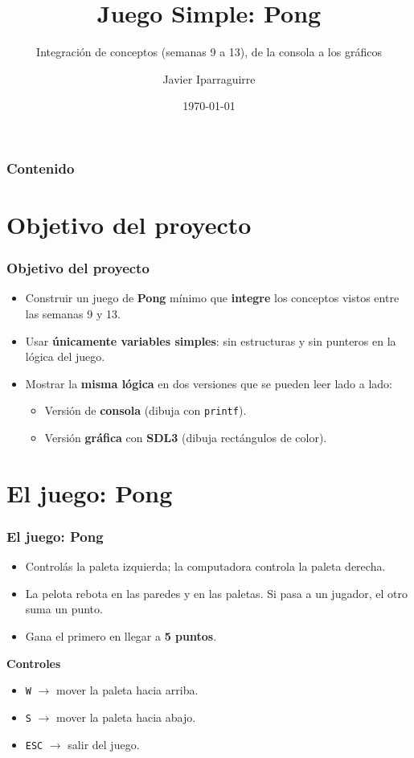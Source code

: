 \documentclass[]{beamer}
\title[Juego Simple: Pong]{Juego Simple: Pong}
\subtitle{Integración de conceptos (semanas 9 a 13), de la consola a los gráficos}
\author[J. Iparraguirre] {Javier Iparraguirre}
\institute{
Universidad Tecnológica Nacional\\
11 de abril 461, Bahía Blanca, Argentina\\
\email\\
\url{http://www.frbb.utn.edu.ar/}}
\date{\today}
\begin{document}
\begin{frame}
  \titlepage
\end{frame}

\begin{frame}
  \frametitle{Contenido}
  \tableofcontents
\end{frame}

\section{Objetivo del proyecto}
\begin{frame}
  \frametitle{Objetivo del proyecto}
  \begin{itemize}
    \item Construir un juego de \textbf{Pong} mínimo que \textbf{integre} los conceptos vistos entre las semanas 9 y 13.
    \item Usar \textbf{únicamente variables simples}: sin estructuras y sin punteros en la lógica del juego.
    \item Mostrar la \textbf{misma lógica} en dos versiones que se pueden leer lado a lado:
    \begin{itemize}
      \item Versión de \textbf{consola} (dibuja con \texttt{printf}).
      \item Versión \textbf{gráfica} con \textbf{SDL3} (dibuja rectángulos de color).
    \end{itemize}
  \end{itemize}
\end{frame}

\section{El juego: Pong}
\begin{frame}
  \frametitle{El juego: Pong}
  \begin{itemize}
    \item Controlás la paleta izquierda; la computadora controla la paleta derecha.
    \item La pelota rebota en las paredes y en las paletas. Si pasa a un jugador, el otro suma un punto.
    \item Gana el primero en llegar a \textbf{5 puntos}.
  \end{itemize}
  \vspace{1em}
  \textbf{Controles}
  \begin{itemize}
    \item \texttt{W} $\rightarrow$ mover la paleta hacia arriba.
    \item \texttt{S} $\rightarrow$ mover la paleta hacia abajo.
    \item \texttt{ESC} $\rightarrow$ salir del juego.
  \end{itemize}
\end{frame}
\end{document}
